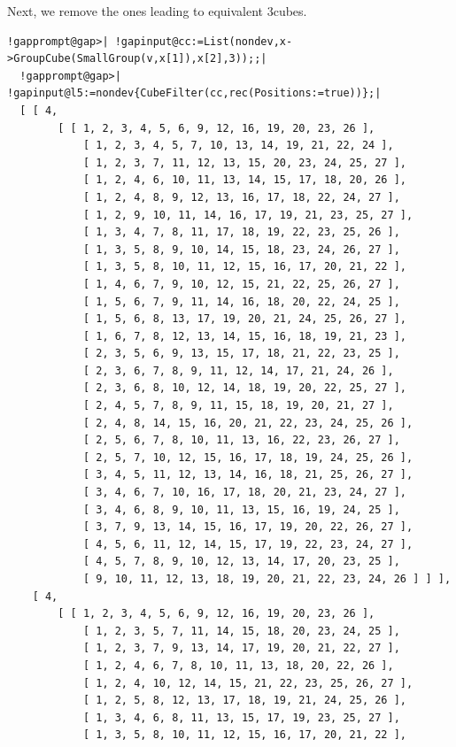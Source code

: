 \documentclass[a4paper,11pt]{report}
\begin{document}
{{ Next, we remove the ones leading to equivalent 3\texttt{}cubes. 
\begin{Verbatim}[commandchars=!@|,fontsize=\small,frame=single,label=Example]
  !gapprompt@gap>| !gapinput@cc:=List(nondev,x->GroupCube(SmallGroup(v,x[1]),x[2],3));;|
  !gapprompt@gap>| !gapinput@l5:=nondev{CubeFilter(cc,rec(Positions:=true))};|
  [ [ 4, 
        [ [ 1, 2, 3, 4, 5, 6, 9, 12, 16, 19, 20, 23, 26 ], 
            [ 1, 2, 3, 4, 5, 7, 10, 13, 14, 19, 21, 22, 24 ], 
            [ 1, 2, 3, 7, 11, 12, 13, 15, 20, 23, 24, 25, 27 ], 
            [ 1, 2, 4, 6, 10, 11, 13, 14, 15, 17, 18, 20, 26 ], 
            [ 1, 2, 4, 8, 9, 12, 13, 16, 17, 18, 22, 24, 27 ], 
            [ 1, 2, 9, 10, 11, 14, 16, 17, 19, 21, 23, 25, 27 ], 
            [ 1, 3, 4, 7, 8, 11, 17, 18, 19, 22, 23, 25, 26 ], 
            [ 1, 3, 5, 8, 9, 10, 14, 15, 18, 23, 24, 26, 27 ], 
            [ 1, 3, 5, 8, 10, 11, 12, 15, 16, 17, 20, 21, 22 ], 
            [ 1, 4, 6, 7, 9, 10, 12, 15, 21, 22, 25, 26, 27 ], 
            [ 1, 5, 6, 7, 9, 11, 14, 16, 18, 20, 22, 24, 25 ], 
            [ 1, 5, 6, 8, 13, 17, 19, 20, 21, 24, 25, 26, 27 ], 
            [ 1, 6, 7, 8, 12, 13, 14, 15, 16, 18, 19, 21, 23 ], 
            [ 2, 3, 5, 6, 9, 13, 15, 17, 18, 21, 22, 23, 25 ], 
            [ 2, 3, 6, 7, 8, 9, 11, 12, 14, 17, 21, 24, 26 ], 
            [ 2, 3, 6, 8, 10, 12, 14, 18, 19, 20, 22, 25, 27 ], 
            [ 2, 4, 5, 7, 8, 9, 11, 15, 18, 19, 20, 21, 27 ], 
            [ 2, 4, 8, 14, 15, 16, 20, 21, 22, 23, 24, 25, 26 ], 
            [ 2, 5, 6, 7, 8, 10, 11, 13, 16, 22, 23, 26, 27 ], 
            [ 2, 5, 7, 10, 12, 15, 16, 17, 18, 19, 24, 25, 26 ], 
            [ 3, 4, 5, 11, 12, 13, 14, 16, 18, 21, 25, 26, 27 ], 
            [ 3, 4, 6, 7, 10, 16, 17, 18, 20, 21, 23, 24, 27 ], 
            [ 3, 4, 6, 8, 9, 10, 11, 13, 15, 16, 19, 24, 25 ], 
            [ 3, 7, 9, 13, 14, 15, 16, 17, 19, 20, 22, 26, 27 ], 
            [ 4, 5, 6, 11, 12, 14, 15, 17, 19, 22, 23, 24, 27 ], 
            [ 4, 5, 7, 8, 9, 10, 12, 13, 14, 17, 20, 23, 25 ], 
            [ 9, 10, 11, 12, 13, 18, 19, 20, 21, 22, 23, 24, 26 ] ] ], 
    [ 4, 
        [ [ 1, 2, 3, 4, 5, 6, 9, 12, 16, 19, 20, 23, 26 ], 
            [ 1, 2, 3, 5, 7, 11, 14, 15, 18, 20, 23, 24, 25 ], 
            [ 1, 2, 3, 7, 9, 13, 14, 17, 19, 20, 21, 22, 27 ], 
            [ 1, 2, 4, 6, 7, 8, 10, 11, 13, 18, 20, 22, 26 ], 
            [ 1, 2, 4, 10, 12, 14, 15, 21, 22, 23, 25, 26, 27 ], 
            [ 1, 2, 5, 8, 12, 13, 17, 18, 19, 21, 24, 25, 26 ], 
            [ 1, 3, 4, 6, 8, 11, 13, 15, 17, 19, 23, 25, 27 ], 
            [ 1, 3, 5, 8, 10, 11, 12, 15, 16, 17, 20, 21, 22 ], 

\end{Verbatim}}}
\end{document}

